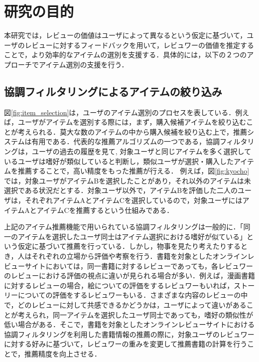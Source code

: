 \documentclass[a4paper,11pt,oneside,openany]{jsbook}
\begin{document}
	\section{研究の目的}
本研究では，レビューの価値はユーザによって異なるという仮定に基づいて，ユーザのレビューに対するフィードバックを用いて，レビュワーの価値を推定することで，より効率的なアイテムの選別を支援する．具体的には，以下の２つのアプローチでアイテム選別の支援を行う．
\par
\subsection{協調フィルタリングによるアイテムの絞り込み}

図\ref{fig:item_selection}は，ユーザのアイテム選別のプロセスを表している．例えば，ユーザがアイテムを選別する際には，まず，購入候補アイテムを絞り込むことが考えられる．莫大な数のアイテムの中から購入候補を絞り込む上で，推薦システムは有用である．代表的な推薦アルゴリズムの一つである，協調フィルタリングは，ユーザの過去の履歴を見て, 対象ユーザと同じアイテムを多く選択しているユーザは嗜好が類似していると判断し，類似ユーザが選択・購入したアイテムを推薦することで，高い精度をもった推薦が行える．
例えば，図\ref{fig:kyocho}では，対象ユーザがアイテムBを選択したことがあり，それ以外のアイテムは未選択である状況だとする．対象ユーザ以外で，アイテムBを評価した二人のユーザは，それぞれアイテムAとアイテムCを選択しているので，対象ユーザにはアイテムAとアイテムCを推薦するという仕組みである．
\par
上記のアイテム推薦機能で用いられている協調フィルタリングは一般的に．「同一のアイテムを選択したユーザ同士はアイテム選択における嗜好が似ている」という仮定に基づいて推薦を行っている．しかし，物事を見たり考えたりするとき，人はそれぞれの立場から評価や考察を行う．書籍を対象としたオンラインレビューサイトにおいては，同一書籍に対するレビューであっても，各レビュワーのレビューにおける評価の視点に違いが見られる場合が多い．例えば，漫画書籍に対するレビューの場合，絵についての評価をするレビュワーもいれば，ストーリーについての評価をするレビュワーもいる．さまざまな内容のレビューの中で，どのレビューに対して共感できるかどうかは，ユーザによって違いがあることが考えられ，同一アイテムを選択したユーザ同士であっても，嗜好の類似性が低い場合がある．そこで，書籍を対象としたオンラインレビューサイトにおける協調フィルタリングを利用した書籍情報の推薦の際に，対象ユーザのレビュワーに対する好みに基づいて，レビュワーの重みを変更して推薦書籍の計算を行うことで，推薦精度を向上させる．
\end{document}
